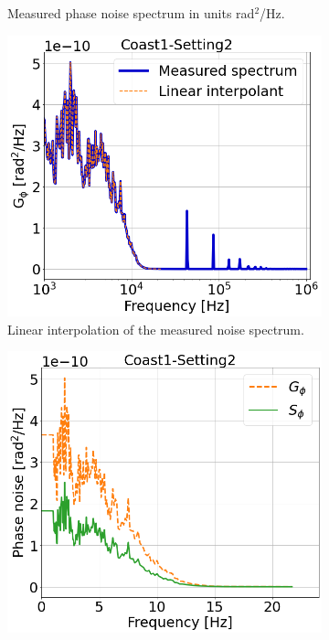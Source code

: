 \begin{figure}[!ht]
\begin{subfigure}[t]{0.42\textwidth}
        \caption{Measured phase noise spectrum in  units rad$^2$/Hz.}
        \label{fig:coast1_setting2_b}
    \end{subfigure}
    \hfill
    \begin{subfigure}[t]{0.42\textwidth}
        \centering
        \includegraphics[width=1\textwidth]{./images/app_B/coast1_setting2_Gyy_linear_interpolation.png}
        \caption{Linear interpolation of the measured noise spectrum. %
        }
        \label{fig:coast1_setting2_c}
    \end{subfigure}
    \hfill
    \begin{subfigure}[t]{0.42\textwidth}
        \centering
        \includegraphics[width=1\textwidth]{./images/app_B/coast1_setting2_Gyy_2_Syy.png}

\end{subfigure}
\end{figure}
